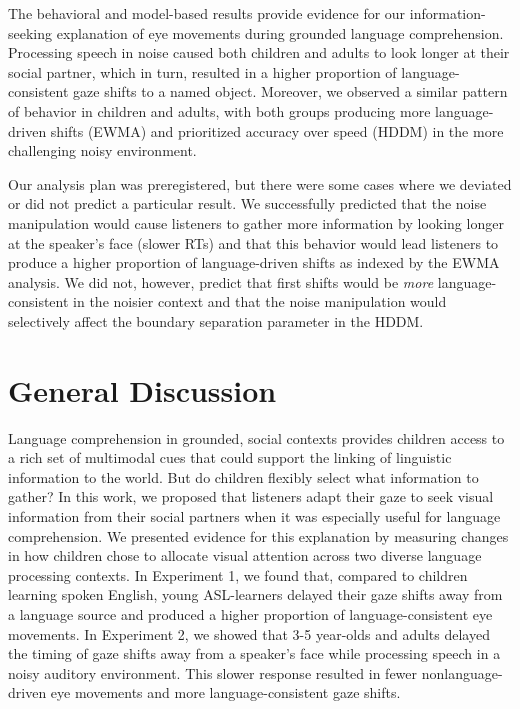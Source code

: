 \documentclass[,man,floatsintext]{apa6}
\begin{document}
The behavioral and model-based results provide evidence for our
information-seeking explanation of eye movements during grounded
language comprehension. Processing speech in noise caused both children
and adults to look longer at their social partner, which in turn,
resulted in a higher proportion of language-consistent gaze shifts to a
named object. Moreover, we observed a similar pattern of behavior in
children and adults, with both groups producing more language-driven
shifts (EWMA) and prioritized accuracy over speed (HDDM) in the more
challenging noisy environment.

Our analysis plan was preregistered, but there were some cases where we
deviated or did not predict a particular result. We successfully
predicted that the noise manipulation would cause listeners to gather
more information by looking longer at the speaker's face (slower RTs)
and that this behavior would lead listeners to produce a higher
proportion of language-driven shifts as indexed by the EWMA analysis. We
did not, however, predict that first shifts would be \emph{more}
language-consistent in the noisier context and that the noise
manipulation would selectively affect the boundary separation parameter
in the HDDM.

\hypertarget{general-discussion}{%
\section{General Discussion}\label{general-discussion}}

Language comprehension in grounded, social contexts provides children
access to a rich set of multimodal cues that could support the linking
of linguistic information to the world. But do children flexibly select
what information to gather? In this work, we proposed that listeners
adapt their gaze to seek visual information from their social partners
when it was especially useful for language comprehension. We presented
evidence for this explanation by measuring changes in how children chose
to allocate visual attention across two diverse language processing
contexts. In Experiment 1, we found that, compared to children learning
spoken English, young ASL-learners delayed their gaze shifts away from a
language source and produced a higher proportion of language-consistent
eye movements. In Experiment 2, we showed that 3-5 year-olds and adults
delayed the timing of gaze shifts away from a speaker's face while
processing speech in a noisy auditory environment. This slower response
resulted in fewer nonlanguage-driven eye movements and more
language-consistent gaze shifts.
\end{document}

